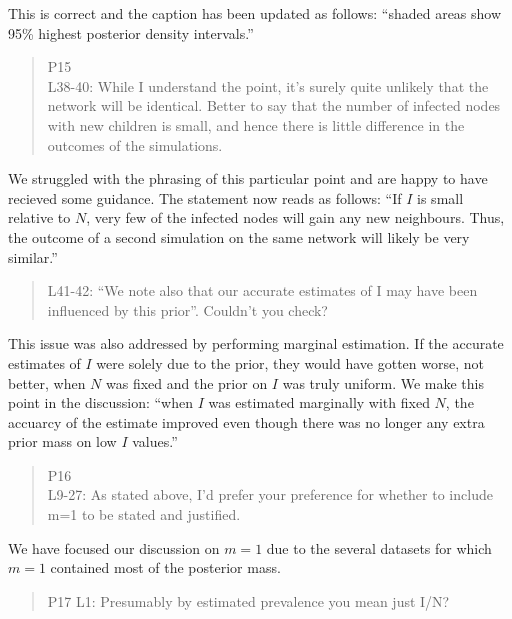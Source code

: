 \documentclass[12pt]{letter}
\begin{document}
\begin{letter}{ }
This is correct and the caption has been updated as follows: ``shaded areas
show 95\% highest posterior density intervals.''

\begin{quote}
  \itshape

  P15 \\
  L38-40: While I understand the point, it’s surely quite unlikely that the
  network will be identical. Better to say that the number of infected nodes
  with new children is small, and hence there is little difference in the
  outcomes of the simulations.
\end{quote}

We struggled with the phrasing of this particular point and are happy to have
recieved some guidance. The statement now reads as follows: ``If $I$ is small
relative to $N$, very few of the infected nodes will gain any new neighbours.
Thus, the outcome of a second simulation on the same network will likely be
very similar.''

\begin{quote}
  \itshape

  L41-42: “We note also that our accurate estimates of I may have been
  influenced by this prior”. Couldn’t you check?
\end{quote}

This issue was also addressed by performing marginal estimation. If the
accurate estimates of $I$ were solely due to the prior, they would have gotten
worse, not better, when $N$ was fixed and the prior on $I$ was truly uniform.
We make this point in the discussion: ``when $I$ was estimated marginally with
fixed $N$, the accuarcy of the estimate improved even though there was no
longer any extra prior mass on low $I$ values.''

\begin{quote}
  \itshape

  P16 \\
  L9-27: As stated above, I'd prefer your preference for whether to include m=1
  to be stated and justified.
\end{quote}

We have focused our discussion on $m = 1$ due to the several datasets for which
$m = 1$ contained most of the posterior mass.

\begin{quote}
  \itshape

  P17
  L1: Presumably by estimated prevalence you mean just I/N?
\end{quote}


\end{letter}
\end{document}
